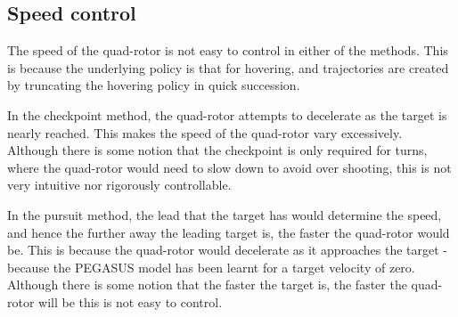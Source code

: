 \documentclass[hidelinks,BTech]{iitmdiss}
\newcommand\todo[1]{\textcolor{red}{{\bf TODO}: #1}}
\begin{document}
\subsection{Speed control}
The speed of the quad-rotor is not easy to control in either of the methods. This is because the underlying policy is that for hovering, and trajectories are created by truncating the hovering policy in quick succession.

In the checkpoint method, the quad-rotor attempts to decelerate as the target is nearly reached. This makes the speed of the quad-rotor vary excessively. Although there is some notion that the checkpoint is only required for turns, where the quad-rotor would need to slow down to avoid over shooting, this is not very intuitive nor rigorously controllable.

In the pursuit method, the lead that the target has would determine the speed, and hence the further away the leading target is, the faster the quad-rotor would be. This is because the quad-rotor would decelerate as it approaches the target - because the PEGASUS model has been learnt for a target velocity of zero. Although there is some notion that the faster the target is, the faster the quad-rotor will be this is not easy to control.








\begin{singlespace}
  \pagebreak
  \clearpage
  
\end{singlespace}
\end{document}
